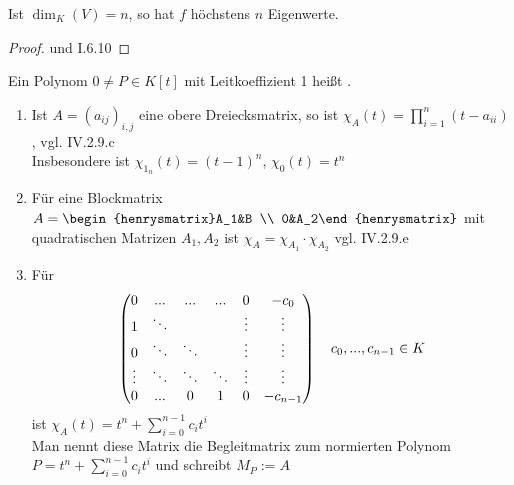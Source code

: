 \begin{conclusion}
	Ist $\dim_K(V)=n$, so hat $f$ höchstens $n$ Eigenwerte.
\end{conclusion}
\begin{proof}
	 und I.6.10 %
\end{proof}

\begin{definition}
	Ein Polynom $0\neq P\in K[t]$ mit Leitkoeffizient 1 heißt .
\end{definition}

\begin{example}
	\begin{enumerate}
		\item Ist $A=(a_{ij})_{i,j}$ eine obere Dreiecksmatrix, so ist $\chi_A(t)=\prod_{i=1}^n (t-a_{ii})$, vgl. IV.2.9.c \\ %
		Insbesondere ist $\chi_{1_n}(t)=(t-1)^n$, $\chi_0(t)=t^n$
		\item Für eine Blockmatrix $A=\begin{henrysmatrix}A_1&B \\ 0&A_2\end{henrysmatrix}$ mit quadratischen Matrizen $A_1,A_2$ ist $\chi_A=\chi_{A_1}\cdot \chi_{A_2}$ vgl. IV.2.9.e %
		\item Für
		\begin{align}
			\begin{pmatrix}
			0&...&...&...&0&-c_0  \\ 
			1& \ddots&\;&\;&\vdots&\vdots  \\ 
			0&\ddots&\ddots&\;&\vdots&\vdots  \\ 
			\vdots&\ddots&\ddots&\ddots&\vdots&\vdots  \\ 
			0&...&0&1&0&-c_{n-1} 
			\end{pmatrix} \quad c_0,...,c_{n-1}\in K \notag
		\end{align}
		ist $\chi_A(t)=t^n+\sum_{i=0}^{n-1} c_i t^i$ \\
		Man nennt diese Matrix die Begleitmatrix zum normierten Polynom $P=t^n+\sum_{i=0}^{n-1} c_i t^i$ und schreibt $M_P:=A$
	\end{enumerate}
\end{example}
